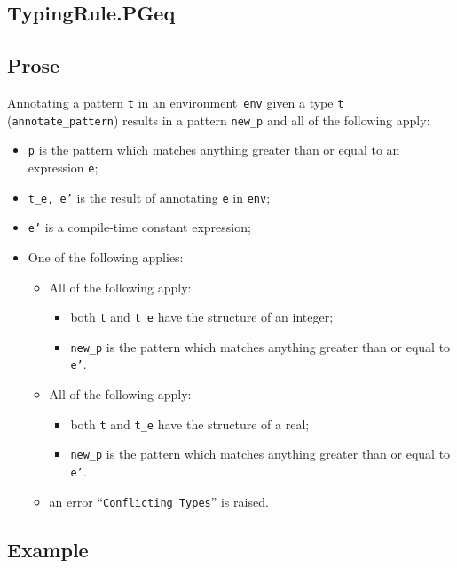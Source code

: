 \documentclass{book}
\begin{document}
\begin{itemize}
\section{TypingRule.PGeq \label{sec:TypingRule.PGeq}}

  \subsection{Prose}
   Annotating a pattern \texttt{t} in an environment~\texttt{env} given a type \texttt{t} (\texttt{annotate\_pattern}) results in a pattern \texttt{new\_p} and all of the following apply:
   \begin{itemize}
   \item \texttt{p} is the pattern which matches anything greater than or equal to an expression \texttt{e};
   \item \texttt{t\_e, e'} is the result of annotating \texttt{e} in \texttt{env};
   \item \texttt{e'} is a compile-time constant expression;
   \item One of the following applies:
     \begin{itemize}
     \item All of the following apply:
           \begin{itemize}
           \item both \texttt{t} and \texttt{t\_e} have the structure of an integer;
           \item \texttt{new\_p} is the pattern which matches anything greater than or equal to \texttt{e'}.
           \end{itemize}
     \item All of the following apply:
           \begin{itemize}
           \item both \texttt{t} and \texttt{t\_e} have the structure of a real;
           \item \texttt{new\_p} is the pattern which matches anything greater than or equal to \texttt{e'}.
           \end{itemize}
     \item an error ``\texttt{Conflicting Types}'' is raised.
     \end{itemize}
   \end{itemize}

  \subsection{Example}



\end{itemize}
\end{document}
